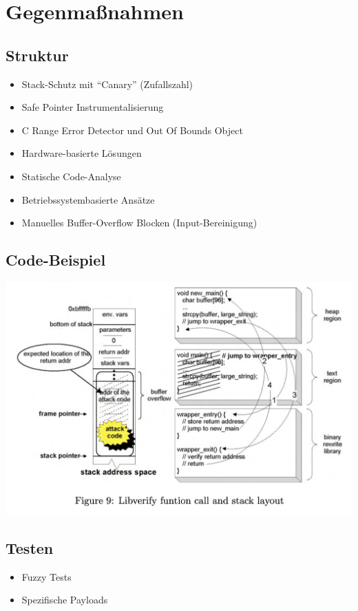 \section{Gegenmaßnahmen}
\subsection{Struktur}
    \begin{itemize}
        \item Stack-Schutz mit ``Canary'' (Zufallszahl)
        \item Safe Pointer Instrumentalisierung
        \item C Range Error Detector und Out Of Bounds Object
        \item Hardware-basierte Lösungen
        \item Statische Code-Analyse
        \item Betriebssystembasierte Ansätze
        \item Manuelles Buffer-Overflow Blocken (Input-Bereinigung)
    \end{itemize}

\subsection{Code-Beispiel}
    \begin{center}
        \includegraphics[width=\textwidth,height=0.75\textheight,keepaspectratio]{images/Libverify.png}
    \end{center}

\subsection{Testen}
    \begin{itemize}
        \item Fuzzy Tests
        \item Spezifische Payloads
    \end{itemize}
